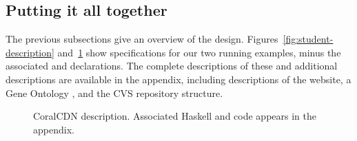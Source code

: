 \subsection{Putting it all together}

The previous subsections give an overview of the \forest{} design.
Figures~\ref{fig:student-description} and~\ref{fig:coral-description}
show \forest{} specifications for our two running examples, minus the
associated \padshaskell{} and \haskell{} declarations.  The complete
descriptions of these \filestores{} and additional descriptions are
available in the \ifanon\auxmaterials\else appendix\fi, including
descriptions of the \pads{} website, a Gene Ontology \filestore{}, and
the CVS repository structure.

\begin{figure}

\caption{\forest{} CoralCDN description. Associated Haskell and
  \pads{} code appears in \ifanon\auxmaterials\else the appendix\fi.}
\label{fig:coral-description}
\end{figure}
